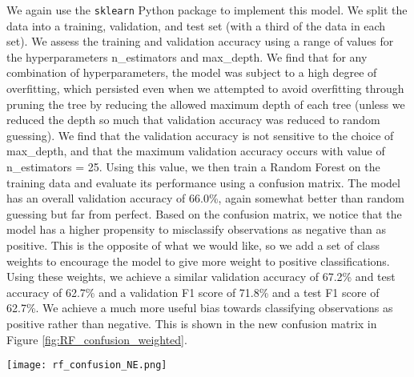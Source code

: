 \documentclass{article}
\begin{document}
We again use the \texttt{sklearn} Python package to implement this model. We split the data into a training, validation, and test set (with a third of the data in each set). We assess the training and validation accuracy using a range of values for the hyperparameters n\_estimators and max\_depth. We find that for any combination of hyperparameters, the model was subject to a high degree of overfitting, which persisted even when we attempted to avoid overfitting through pruning the tree by reducing the allowed maximum depth of each tree (unless we reduced the depth so much that validation accuracy was reduced to random guessing). We find that the validation accuracy is not sensitive to the choice of max\_depth, and that the maximum validation accuracy occurs with value of n\_estimators = 25.  Using this value, we then train a Random Forest on the training data and evaluate its performance using a confusion matrix. The model has an overall validation accuracy of 66.0\%, again somewhat better than random guessing but far from perfect. Based on the confusion matrix, we notice that the model has a higher propensity to misclassify observations as negative than as positive. This is the opposite of what we would like, so we add a set of class weights to encourage the model to give more weight to positive classifications. Using these weights, we achieve a similar validation accuracy of 67.2\% and test accuracy of 62.7\% and a validation F1 score of 71.8\% and a test F1 score of 62.7\%. We achieve a much more useful bias towards classifying observations as positive rather than negative. This is shown in the new confusion matrix in Figure \ref{fig:RF_confusion_weighted}.


\begin{figure*}[ht]
\centering
\texttt{[image: rf\_confusion\_NE.png]}
\caption{A confusion matrix for our RF classifier trained using n-estimators=25, using class weights to emphasize false positives over false negatives. The classifier does not give high performance.}
\label{fig:RF_confusion_weighted}
\end{figure*}
\end{document}
